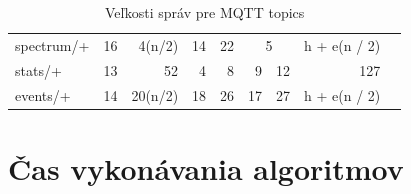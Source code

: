 \begin{table}[h]
\begin{tabular}{|l|r|r|rr|cr|r|l}
spectrum/+                           & 16                                                                                                        & 4(n/2)                                                                                                & \multicolumn{1}{r|}{14}            & 22                                 & \multicolumn{2}{c|}{5}                                                  & h + e(n / 2)                                                                                                 &           \\ \cline{1-8}
stats/+                              & 13                                                                                                        & 52                                                                                                     & \multicolumn{1}{r|}{4}             & 8                                  & \multicolumn{1}{r|}{9}             & 12                                 & 127                                                                                                           &           \\ \cline{1-8}
events/+                             & 14                                                                                                        & 20(n/2)                                                                                               & \multicolumn{1}{r|}{18}            & 26                                 & \multicolumn{1}{r|}{17}            & 27                                 & h + e(n / 2)                                                                                                &           \\ \cline{1-8}
\end{tabular}
\caption{Veľkosti správ pre MQTT topics}
\end{table}



\section{Čas vykonávania algoritmov}

